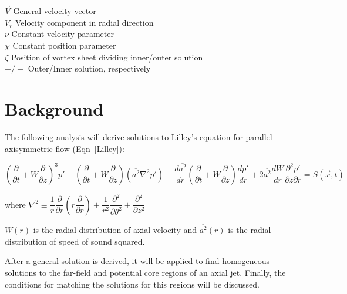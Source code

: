 \documentclass[]{aiaa-tc}%
\begin{document}
\begin{multicols}{2}
\begin{tabbing}
  $\vec{V}$           \> General velocity vector \\
  $V_r$               \> Velocity component in radial direction \\
  $\nu$               \> Constant velocity parameter \\
  $\chi$              \> Constant position parameter \\
  $\zeta$             \> Position of vortex sheet dividing inner/outer solution \\
  $+/-$               \> Outer/Inner solution, respectively \\




\end{tabbing}

\end{multicols}

\section{Background} %

The following analysis will derive solutions to Lilley's equation for parallel axisymmetric flow (Eqn~\ref{Lilley}):

\begin{equation} \label{Lilley}
\left( \dfrac{\partial}{\partial t} + W \dfrac{\partial}{\partial z} \right)^3 p'
- \left( \dfrac{\partial}{\partial t} + W \dfrac{\partial}{\partial z} \right) \left( \overline{a^2} \nabla^2p' \right)
- \dfrac{d \overline{a^2}}{dr} \left( \dfrac{\partial}{\partial t} + W \dfrac{\partial}{\partial z} \right) \dfrac{dp'}{dr}
+ 2\overline{a^2} \dfrac{dW}{dr}\dfrac{\partial^2 p'}{\partial z \partial r}
= S(\vec{x}, t)
\end{equation}

\begin{center}
where $\nabla^2 \equiv \dfrac{1}{r}\dfrac{\partial}{\partial r} \left( r\dfrac{\partial}{\partial r} \right)
+ \dfrac{1}{r^2}\dfrac{\partial^2}{\partial \theta^2}
+ \dfrac{\partial^2}{\partial z^2}$
\end{center}


$W(r)$ is the radial distribution of axial velocity and $\overline{a^2}(r)$ is the radial distribution of speed of sound squared.

After a general solution is derived, it will be applied to find homogeneous solutions to the far-field and potential core regions of an axial jet.  Finally, the conditions for matching the solutions for this regions will be discussed.
\end{document}
